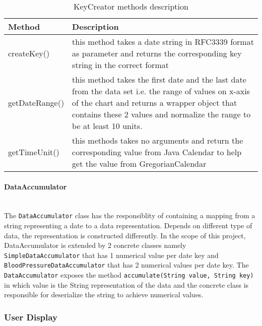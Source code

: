 \begin{table}
\begin{center}
    \begin{tabularx}{\textwidth}{| l | X |}
        \hline Method & Description \\
        \hline createKey() & 
            this method takes a date string in RFC3339 format as parameter and returns the corresponding key string in
            the correct format \\
        \hline getDateRange() &
            this method takes the first date and the last date from the data set i.e. the range of values on x-axis of
            the chart and returns a wrapper object that contains these 2 values and normalize the range to be at least
            10 units. \\
        \hline getTimeUnit() &
            this methods takes no arguments and return the corresponding value from Java Calendar to help get the value
            from GregorianCalendar \\
        \hline
    \end{tabularx}
\end{center}
    \caption{KeyCreator methods description}
\end{table}

\paragraph{DataAccumulator}\mbox{} \\
The \texttt{DataAccumulator} class has the responsiblity of containing a mapping from a string representing a date to a
data representation. Depends on different type of data, the representation is constructed differently. In the scope of
this project, DataAccumulator is extended by 2 concrete classes namely \texttt{SimpleDataAccumulator} that has 1
numerical value per date key and \texttt{BloodPressureDataAccumulator} that has 2 numerical values per date key. The
\texttt{DataAccumulator} exposes the method \texttt{accumulate(String value, String key)} in which value is the String
representation of the data and the concrete class is responsible for deserialize the string to achieve numerical values.


\subsubsection{User Display}
